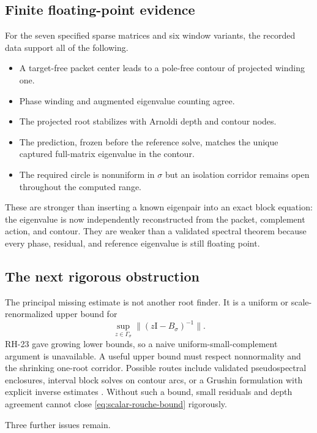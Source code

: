 \documentclass[11pt]{article}
\theoremstyle{definition}
\theoremstyle{remark}
\newcommand{\Id}{\mathrm I}
\begin{document}
\subsection{Finite floating-point evidence}

For the seven specified sparse matrices and six window variants, the
recorded data support all of the following.

\begin{itemize}
 \item A target-free packet center leads to a pole-free contour of projected
 winding one.
 \item Phase winding and augmented eigenvalue counting agree.
 \item The projected root stabilizes with Arnoldi depth and contour nodes.
 \item The prediction, frozen before the reference solve, matches the unique
 captured full-matrix eigenvalue in the contour.
 \item The required circle is nonuniform in $\sigma$ but an isolation
 corridor remains open throughout the computed range.
\end{itemize}

These are stronger than inserting a known eigenpair into an exact block
equation: the eigenvalue is now independently reconstructed from the
packet, complement action, and contour.  They are weaker than a validated
spectral theorem because every phase, residual, and reference eigenvalue is
still floating point.

\subsection{The next rigorous obstruction}

The principal missing estimate is not another root finder.  It is a uniform
or scale-renormalized upper bound for
\[
 \sup_{z\in\Gamma_\sigma}
 \|(z\Id-B_\sigma)^{-1}\|.
\]
RH-23 gave growing lower bounds, so a naive uniform-small-complement
argument is unavailable.  A useful upper bound must respect nonnormality and
the shrinking one-root corridor.  Possible routes include validated
pseudospectral enclosures, interval block solves on contour arcs, or a
Grushin formulation with explicit inverse estimates
\citep{TrefethenEmbree2005,SjoestrandZworski2007}.  Without such a bound,
small residuals and depth agreement cannot close
\cref{eq:scalar-rouche-bound} rigorously.

Three further issues remain.
\end{document}
